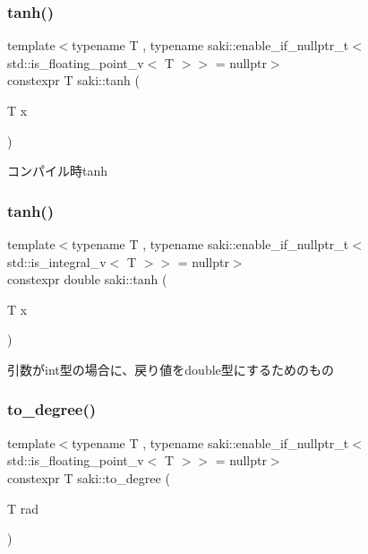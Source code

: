 \subsubsection{\texorpdfstring{tanh()}{tanh()}\hspace{0.1cm}{\footnotesize\ttfamily [1/2]}}
{\footnotesize\ttfamily template$<$typename T , typename saki\+::enable\+\_\+if\+\_\+nullptr\+\_\+t$<$ std\+::is\+\_\+floating\+\_\+point\+\_\+v$<$ T $>$$>$  = nullptr$>$ \\
constexpr T saki\+::tanh (\begin{DoxyParamCaption}\item[{T}]{x }\end{DoxyParamCaption})}



コンパイル時tanh 

\mbox{\label{namespacesaki_a5faf83bc9a4a7e981275deba551d2f3f}} 
\subsubsection{\texorpdfstring{tanh()}{tanh()}\hspace{0.1cm}{\footnotesize\ttfamily [2/2]}}
{\footnotesize\ttfamily template$<$typename T , typename saki\+::enable\+\_\+if\+\_\+nullptr\+\_\+t$<$ std\+::is\+\_\+integral\+\_\+v$<$ T $>$$>$  = nullptr$>$ \\
constexpr double saki\+::tanh (\begin{DoxyParamCaption}\item[{T}]{x }\end{DoxyParamCaption})}



引数がint型の場合に、戻り値をdouble型にするためのもの 

\mbox{\label{namespacesaki_af9f6d8f2c0663a0452c7edd17bf5daf0}} 
\subsubsection{\texorpdfstring{to\+\_\+degree()}{to\_degree()}\hspace{0.1cm}{\footnotesize\ttfamily [1/2]}}
{\footnotesize\ttfamily template$<$typename T , typename saki\+::enable\+\_\+if\+\_\+nullptr\+\_\+t$<$ std\+::is\+\_\+floating\+\_\+point\+\_\+v$<$ T $>$$>$  = nullptr$>$ \\
constexpr T saki\+::to\+\_\+degree (\begin{DoxyParamCaption}\item[{T}]{rad }\end{DoxyParamCaption})}



